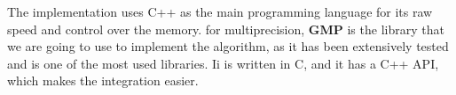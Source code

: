 The implementation uses C++ as the main programming language for its raw speed and control over the memory. for multiprecision, \textbf{GMP} is the library that we are going to use to implement the algorithm, as it has been extensively tested and is one of the most used libraries. Ii is written in C, and it has a C++ API, which makes the integration easier.

\endinput

